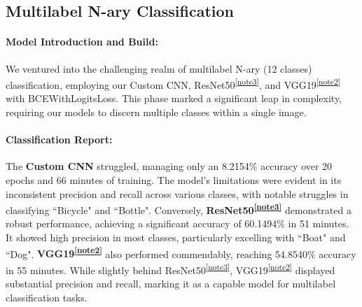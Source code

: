 \documentclass{article} %
\begin{document}
\subsection{Multilabel N-ary Classification}
\paragraph{Model Introduction and Build:}
We ventured into the challenging realm of multilabel N-ary (12 classes) classification, employing our Custom CNN, ResNet50\textsuperscript{\ref{note3}}, and VGG19\textsuperscript{\ref{note2}} with BCEWithLogitsLoss. This phase marked a significant leap in complexity, requiring our models to discern multiple classes within a single image.

\paragraph{Classification Report:}
The \textbf{Custom CNN} struggled, managing only an 8.2154\% accuracy over 20 epochs and 66 minutes of training. The model's limitations were evident in its inconsistent precision and recall across various classes, with notable struggles in classifying ``Bicycle" and ``Bottle". Conversely, \textbf{ResNet50\textsuperscript{\ref{note3}}} demonstrated a robust performance, achieving a significant accuracy of 60.1494\% in 51 minutes. It showed high precision in most classes, particularly excelling with ``Boat" and ``Dog". \textbf{VGG19\textsuperscript{\ref{note2}}} also performed commendably, reaching 54.8540\% accuracy in 55 minutes. While slightly behind ResNet50\textsuperscript{\ref{note3}}, VGG19\textsuperscript{\ref{note2}} displayed substantial precision and recall, marking it as a capable model for multilabel classification tasks.
\end{document}
